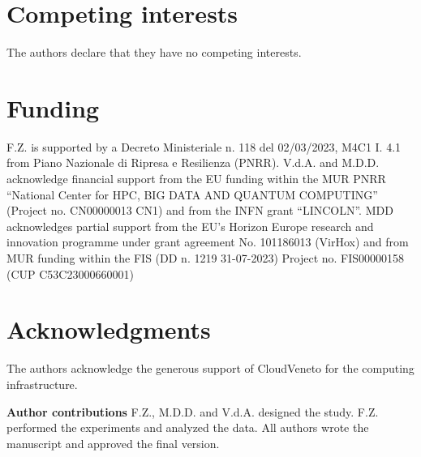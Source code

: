\documentclass[10pt, aps, rmp,  twocolumn, superscriptaddress, floatfix, showkeys]{revtex4-2}
\begin{document}
\section*{Competing interests}
The authors declare that they have no competing interests.

\section*{Funding}
F.Z. is supported by a Decreto Ministeriale n. 118 del 02/03/2023, M4C1 I. 4.1 from Piano Nazionale di Ripresa e Resilienza (PNRR). V.d.A. and M.D.D. acknowledge financial support from the EU funding within the MUR PNRR ``National Center for HPC, BIG DATA AND QUANTUM COMPUTING'' (Project no. CN00000013 CN1) and from the INFN grant ``LINCOLN''. MDD acknowledges partial support from the EU's Horizon Europe research and innovation programme under grant agreement No. 101186013 (VirHox) and from MUR funding within the FIS (DD n. 1219 31-07-2023) Project no. FIS00000158 (CUP C53C23000660001)

\section*{Acknowledgments}
The authors acknowledge the generous support of CloudVeneto for the computing infrastructure.

\vspace{0.2 cm}
\vspace{0.2 cm}


{\bf Author contributions} 
F.Z., M.D.D. and V.d.A. designed the study. F.Z. performed the experiments and analyzed the data. All authors wrote the manuscript and approved the final version.

\vspace{0.2 cm}



\renewcommand{\bibsection}{\section{References}}





\clearpage
\onecolumngrid
\appendix
\setcounter{section}{0}
\renewcommand{\thesection}{S\arabic{section}}
\setcounter{figure}{0}
\renewcommand{\thefigure}{S\arabic{figure}}
\setcounter{equation}{0}
\renewcommand{\theequation}{S\arabic{equation}}
\setcounter{table}{0}
\renewcommand{\thetable}{S\arabic{table}}
\end{document}
